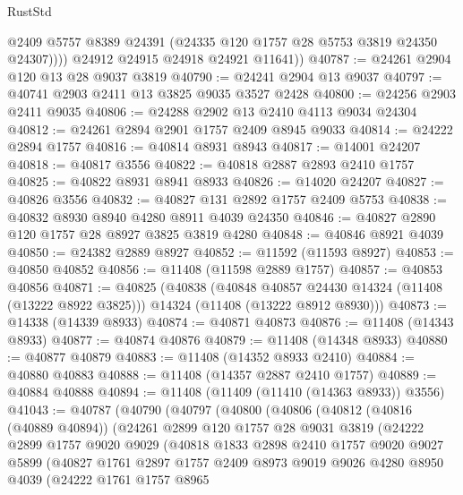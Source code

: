 \begin{lexlean}{RustStd}
\begin{coremodule}
              @2409
              @5757
              @8389
              @24391
              (@24335 @120 @1757 @28 @5753 @3819 @24350 @24307))))
        @24912
        @24915
        @24918
        @24921
        @11641))
@40787 := @24261 @2904 @120 @13 @28 @9037 @3819
@40790 := @24241 @2904 @13 @9037
@40797 := @40741 @2903 @2411 @13 @3825 @9035 @3527 @2428
@40800 := @24256 @2903 @2411 @9035
@40806 := @24288 @2902 @13 @2410 @4113 @9034 @24304
@40812 := @24261 @2894 @2901 @1757 @2409 @8945 @9033
@40814 := @24222 @2894 @1757
@40816 := @40814 @8931 @8943
@40817 := @14001 @24207
@40818 := @40817 @3556
@40822 := @40818 @2887 @2893 @2410 @1757
@40825 := @40822 @8931 @8941 @8933
@40826 := @14020 @24207
@40827 := @40826 @3556
@40832 := @40827 @131 @2892 @1757 @2409 @5753
@40838 := @40832 @8930 @8940 @4280 @8911 @4039 @24350
@40846 := @40827 @2890 @120 @1757 @28 @8927 @3825 @3819 @4280
@40848 := @40846 @8921 @4039
@40850 := @24382 @2889 @8927
@40852 := @11592 (@11593 @8927)
@40853 := @40850 @40852
@40856 := @11408 (@11598 @2889 @1757)
@40857 := @40853 @40856
@40871 := @40825
    (@40838
      (@40848 @40857 @24430 @14324 (@11408 (@13222 @8922 @3825)))
      @14324
      (@11408 (@13222 @8912 @8930)))
@40873 := @14338 (@14339 @8933)
@40874 := @40871 @40873
@40876 := @11408 (@14343 @8933)
@40877 := @40874 @40876
@40879 := @11408 (@14348 @8933)
@40880 := @40877 @40879
@40883 := @11408 (@14352 @8933 @2410)
@40884 := @40880 @40883
@40888 := @11408 (@14357 @2887 @2410 @1757)
@40889 := @40884 @40888
@40894 := @11408 (@11409 (@11410 (@14363 @8933)) @3556)
@41043 := @40787
    (@40790
      (@40797
        (@40800
          (@40806
            (@40812
              (@40816 (@40889 @40894))
              (@24261
                @2899
                @120
                @1757
                @28
                @9031
                @3819
                (@24222
                  @2899
                  @1757
                  @9020
                  @9029
                  (@40818
                    @1833
                    @2898
                    @2410
                    @1757
                    @9020
                    @9027
                    @5899
                    (@40827
                      @1761
                      @2897
                      @1757
                      @2409
                      @8973
                      @9019
                      @9026
                      @4280
                      @8950
                      @4039
                      (@24222
                        @1761
                        @1757
                        @8965

\end{coremodule}
\end{lexlean}
